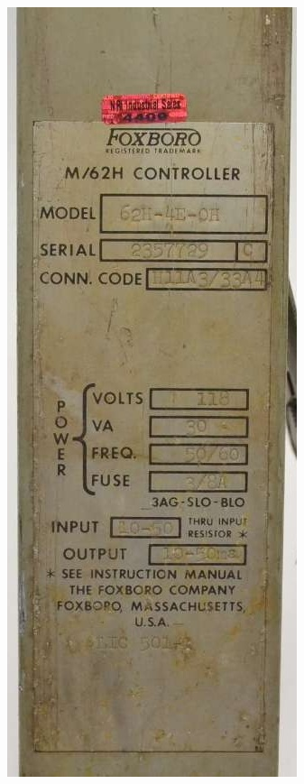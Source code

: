 \begin{frame}
\begin{columns}
\begin{column}{0.2\linewidth}
			\includegraphics[height=0.6\textheight]{img/fb3a}
		\end{column}
		\begin{column}{0.5\linewidth}

\end{column}
\end{columns}
\end{frame}
